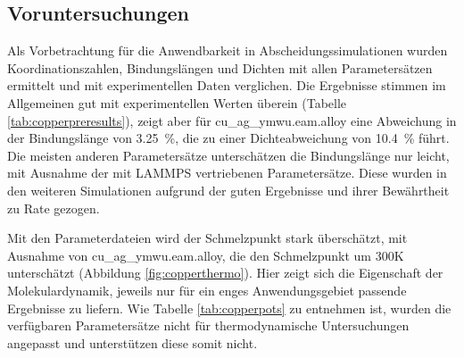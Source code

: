 \subsection{Voruntersuchungen}

Als Vorbetrachtung für die Anwendbarkeit in Abscheidungssimulationen wurden Koordinationszahlen, Bindungslängen und Dichten mit allen Parametersätzen ermittelt und mit experimentellen Daten verglichen.
Die Ergebnisse stimmen im Allgemeinen gut mit experimentellen Werten überein (Tabelle \ref{tab:copperpreresults}), zeigt aber für cu\_ag\_ymwu.eam.alloy eine Abweichung in der Bindungslänge von \SI{3.25}{\percent}, die zu einer Dichteabweichung von \SI{10.4}{\percent} führt.
Die meisten anderen Parametersätze unterschätzen die Bindungslänge nur leicht, mit Ausnahme der mit LAMMPS vertriebenen Parametersätze.
Diese wurden in den weiteren Simulationen aufgrund der guten Ergebnisse und ihrer Bewährtheit zu Rate gezogen.

Mit den Parameterdateien wird der Schmelzpunkt stark überschätzt, mit Ausnahme von cu\_ag\_ymwu.eam.alloy, die den Schmelzpunkt um 300K unterschätzt (Abbildung \ref{fig:copperthermo}).
Hier zeigt sich die Eigenschaft der Molekulardynamik, jeweils nur für ein enges Anwendungsgebiet passende Ergebnisse zu liefern.
Wie Tabelle \ref{tab:copperpots} zu entnehmen ist, wurden die verfügbaren Parametersätze nicht für thermodynamische Untersuchungen angepasst und unterstützen diese somit nicht.

